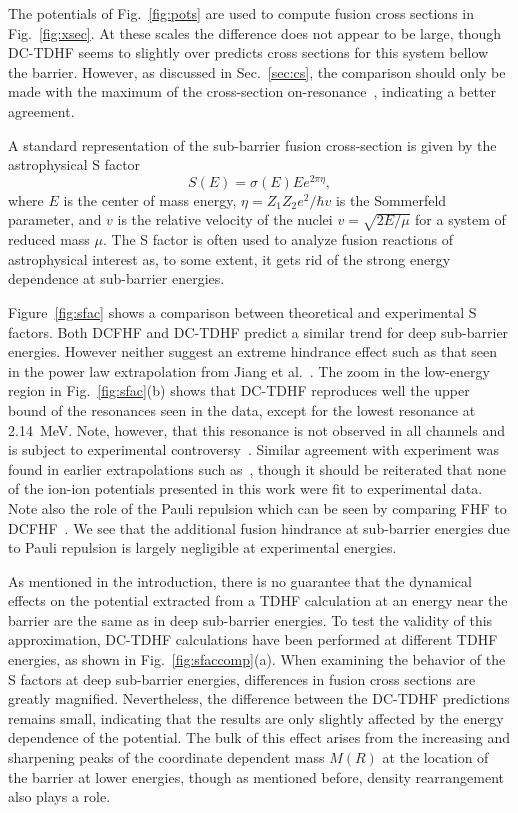 The potentials of Fig.~\ref{fig:pots} are used to compute fusion cross sections in Fig.~\ref{fig:xsec}.
At these scales the difference does not appear to be large, though DC-TDHF seems to slightly over predicts cross sections for this system bellow the barrier.
However, as discussed in Sec.~\ref{sec:cs}, the comparison should only be made with the maximum of the cross-section on-resonance~\protect\citep{jiang2013}, indicating a better agreement. 

A standard representation of the sub-barrier fusion cross-section is given by the astrophysical S factor 
\begin{equation}
S(E)=\sigma(E)Ee^{2\pi \eta},
\end{equation}
where $E$ is the center of mass energy, $\eta=Z_1Z_2e^2/\hbar v$ is the Sommerfeld parameter, and $v$ is the relative velocity of the nuclei $v=\sqrt{2E/\mu}$ for a system of reduced mass $\mu$.
The S factor is often used to analyze fusion reactions of astrophysical interest as, to some extent, it gets rid of the strong energy dependence at sub-barrier energies.

Figure~\ref{fig:sfac} shows a comparison between theoretical and experimental S factors. 
Both DCFHF and DC-TDHF predict a similar trend for deep sub-barrier energies.
However neither suggest an extreme hindrance effect such as that seen in the power law extrapolation from Jiang et al.~\protect\citep{jiang2007}.
The zoom in the low-energy region in Fig.~\ref{fig:sfac}(b) shows that DC-TDHF reproduces well the upper bound of the resonances seen in the data, except for the lowest resonance at 2.14~MeV. 
Note, however, that this resonance is not observed in all channels and is subject to experimental controversy~\protect\citep{tang2018}.
Similar agreement with experiment was found in earlier extrapolations such as~\protect\citep{fowler1975,gasques2005}, though it should be reiterated that none of the ion-ion potentials presented in this work were fit to experimental data.
Note also the role of the Pauli repulsion which can be seen by comparing FHF to DCFHF~\protect\citep{simenel2017}. 
We see that the additional fusion hindrance at sub-barrier energies due to Pauli repulsion is largely negligible at experimental energies.

As mentioned in the introduction, there is no guarantee that the dynamical effects on the potential extracted from a TDHF calculation at an energy near the barrier are the same as in deep sub-barrier energies. 
To test the validity of this approximation,  DC-TDHF calculations have been performed at different TDHF energies, as shown in Fig.~\ref{fig:sfaccomp}(a).
When examining the behavior of the S factors at deep sub-barrier energies, differences in fusion cross sections are greatly magnified.
Nevertheless, the difference between the DC-TDHF predictions remains small, indicating that the results are only slightly affected by the energy dependence of the potential. 
The bulk of this effect arises from the increasing and sharpening peaks of the coordinate dependent mass $M(R)$ at the location of the barrier at lower energies, though as mentioned before, density rearrangement also plays a role. 

